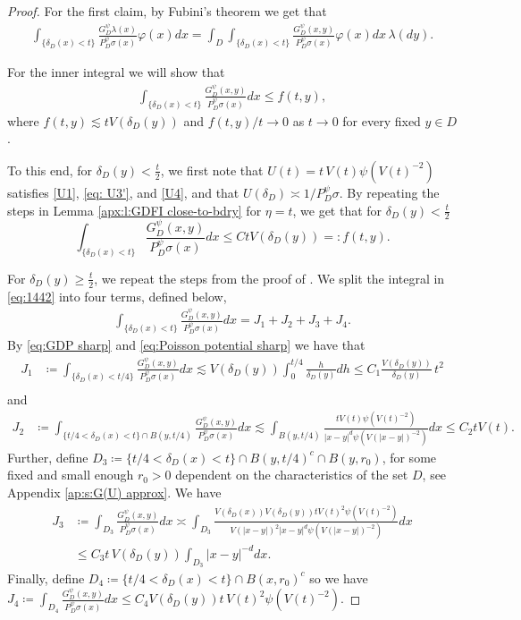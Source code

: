 \documentclass[12pt,a4paper,onecolumn]{article}
\theoremstyle{definition}
\newcommand{\1}{\mathbf 1}
\newcommand{\de}{\delta_D}
\newcommand{\GDP}{G_D^\psi}
\newcommand{\PDS}{P^{\psi}_{ D}}
\numberwithin{equation}{section}
\begin{document}
    \begin{proof}
        For the first claim, by Fubini's theorem we get that
        \begin{align*}
        	\int_{\{\de(x)<t\}}\frac{\GDP \lambda(x)}{\PDS\sigma(x)}\varphi(x)dx=\int_D\int_{\{\de(x)<t\}}\frac{\GDP(x,y)}{\PDS\sigma(x)}\varphi(x)dx\,\lambda(dy).
        \end{align*}

    For the inner integral we will show that
        \begin{align}\label{eq:1442}
            \int_{\{\de(x)<t\}}\frac{\GDP(x,y)}{\PDS\sigma(x)}dx\le f(t,y),
        \end{align}
        where $f(t,y)\lesssim t V(\de(y))$ and $f(t,y)/t\to 0$ as $t\to 0$ for every fixed $y\in D$.
        
        To this end, for $\de(y)<\frac{t}{2}$, we first note that $U(t)=t\,V(t)\psi(V(t)^{-2})$ satisfies \ref{U1}, \eqref{eq: U3'}, and \ref{U4}, and that $U(\de)\asymp 1/\PDS\sigma$. By repeating the steps in Lemma \ref{apx:l:GDFI close-to-bdry} for $\eta=t$, we get that for $\de(y)<\frac{t}{2}$
        \[
        \int_{\{\de(x)<t\}}\frac{\GDP(x,y)}{\PDS\sigma(x)}dx\le Ct V(\de(y))=:f(t,y).        
        \]

        For $\de(y)\ge \frac{t}2$, we repeat the steps from the proof of \cite[Lemma A.5]{Bio23cpaa}. We split the integral in \eqref{eq:1442} into four terms, defined below,
        \begin{align*}
        	\int_{\{\de(x)<t\}}\frac{\GDP(x,y)}{\PDS\sigma(x)}dx=J_1+J_2+J_3+J_4.
        \end{align*}
        By \eqref{eq:GDP sharp} and \eqref{eq:Poisson potential sharp} we have that
        \begin{align*}
        	J_1&\coloneqq \int_{\{\de(x)<t/4\}}\frac{\GDP(x,y)}{\PDS\sigma(x)}dx\lesssim V(\de(y))\int_0^{t/4}\frac{h}{\de(y)}dh
        	\le  C_1\frac{V(\de(y))}{\de(y)}\,t^2\\
        \end{align*}
        and
        \begin{align*}
         	J_2&\coloneqq \int_{\{t/4<\de(x)<t\}\cap B(y,t/4)}\frac{\GDP(x,y)}{\PDS\sigma(x)}dx\lesssim \int_{B(y,t/4)}\frac{t V(t) \psi(V(t)^{-2}) }{|x-y|^d \psi(V(|x-y|)^{-2})}dx
        	\le C_2 t V(t).
        \end{align*}
        Further, define $D_3\coloneqq \{t/4<\de(x)<t\}\cap B(y,t/4)^c\cap B(y,r_0)$, for some fixed and small enough $r_0>0$ dependent on the characteristics of the set $D$, see Appendix \ref{ap:s:G(U) approx}. We have
		\begin{align*}
			J_3 &\coloneqq \int_{D_3}\frac{\GDP(x,y)}{\PDS\sigma(x)}dx\asymp \int_{D_3} \frac{ V(\de(x))V(\de(y))t V(t)^2 \psi(V(t)^{-2})}{V(|x-y|)^2|x-y|^d\psi(V(|x-y|)^{-2})}dx\\
			&\le C_3  t\,V(\de(y))\int_{D_3}|x-y|^{-d}dx.
		\end{align*}
		Finally, define $D_4\coloneqq \{t/4<\de(x)<t\}\cap B(x,r_0)^c$ so we have $J_4\coloneqq \int_{D_4}\frac{\GDP(x,y)}{\PDS\sigma(x)}dx\le C_4 V(\de(y))t\,V(t)^2\psi(V(t)^{-2}).$
        

\end{proof}
\end{document}

